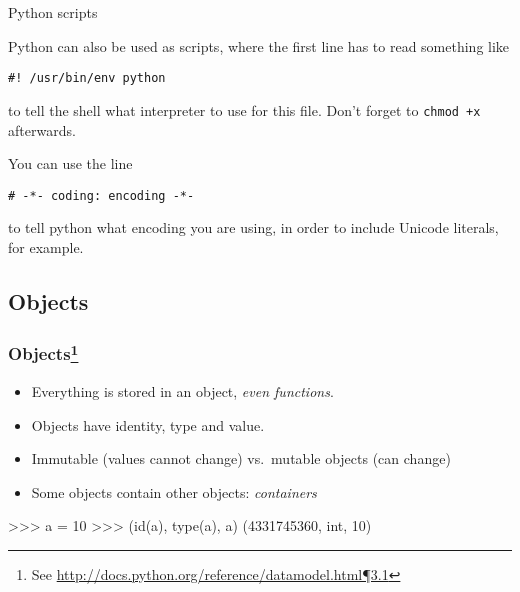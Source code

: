 \documentclass[xetex,10pt]{beamer}
\begin{document}
\begin{frame}[fragile]{Python scripts}
	
	Python can also be used as scripts, where the first line has to read something like
	
\begin{verbatim}
#! /usr/bin/env python
\end{verbatim}
	
	to tell the shell what interpreter to use for this file. Don't forget to \verb!chmod +x! afterwards.\\

	\vspace*{1em}

	You can use the line

\begin{verbatim}
# -*- coding: encoding -*-
\end{verbatim}

	to tell python what encoding you are using, in order to include Unicode literals, for example.

\end{frame}


\subsection{Objects}

\begin{frame}[fragile]
	\frametitle{Objects\footnote[frame]{See \href{http://docs.python.org/reference/datamodel.html\#objects-values-and-types}{http://docs.python.org/reference/datamodel.html¶3.1}}}

	\begin{itemize}
		\item Everything is stored in an object, \emph{even functions}.
		\item Objects have identity, type and value.
		\item Immutable (values cannot change) vs.\ mutable objects (can change)
		\item Some objects contain other objects: \emph{containers}
	\end{itemize}
	

	\vspace*{1em}

	
	\begin{python}
	>>> a = 10
	>>> (id(a), type(a), a)
	(4331745360, int, 10)
	\end{python}

\end{frame}
\end{document}
